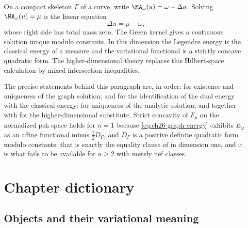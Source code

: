 \begin{example}
\label{ex:ch28-graph-case}
On a compact skeleton $\Gamma$ of a curve, write
$\MA_\omega(u)=\omega+\Delta u$.  Solving
$\MA_\omega(u)=\mu$ is the linear equation
\[
                          \Delta u=\mu-\omega,
\]
whose right side has total mass zero.  The Green kernel gives a continuous
solution unique modulo constants.  In this dimension the Legendre energy is
the classical energy of a measure and the variational functional is a
strictly concave quadratic form.  The higher-dimensional theory replaces
this Hilbert-space calculation by mixed intersection inequalities.

The precise statements behind this paragraph are, in order:
 for existence and uniqueness of the graph
solution;  and
 for the identification of the dual energy
with the classical energy;  for uniqueness
of the analytic solution; and
 together with
 for the higher-dimensional substitute.  Strict
concavity of $F_\mu$ on the normalized psh space holds for $n=1$ because
\eqref{eq:ch26-graph-energy} exhibits $E_\omega$ as an affine functional
minus $\tfrac12D_\Gamma$, and $D_\Gamma$ is a positive definite
quadratic form modulo constants; that is exactly the equality clause of
 in dimension one, and it is what fails to be
available for $n\geq2$ with merely nef classes.
\end{example}

\section{Chapter dictionary}
\label{sec:ch28-dictionary}

\subsection{Objects and their variational meaning}
\label{sec:ch28-dict-objects}

